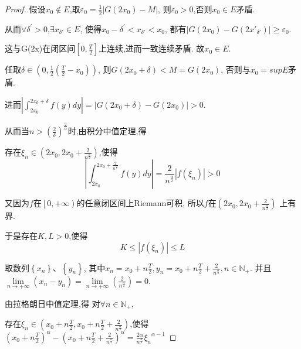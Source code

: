\documentclass[lang=cn,newtx,10pt,scheme=chinese]{elegantbook}
\begin{document}
\begin{proof}
假设$x_0\notin E$,取$\varepsilon _0=\frac{1}{2}\left| G\left( 2x_0 \right) -M \right|$,
则$\varepsilon _0>0$,否则$x_0\in E$矛盾.

从而$\forall \delta ^{\prime}>0$,$\exists x_{\delta'}\in E$,
使得$ x_0-\delta ^{\prime}<x_{\delta'}<x_0$,
都有$\left| G\left( 2x_0 \right) -G\left( 2x'_{\delta'} \right) \right|\geqslant \varepsilon _0$.

这与G(2x)在闭区间$\left[ 0,\frac{T}{2} \right]$上连续,进而一致连续矛盾.
故$x_0\in E$.

任取$\delta \in \left( 0,\frac{1}{2}\left( \frac{T}{2}-x_0 \right) \right) $,
则$G\left( 2x_0+\delta \right) <M=G\left( 2x_0 \right) $,
否则与$x_0=supE$矛盾.

进而$\left| \int_{2x_0}^{2x_0+\delta}{f\left( y \right) dy} \right|=\left| G\left( 2x_0+\delta \right) -G\left( 2x_0 \right) \right|>0$.

从而当$n>\left( \frac{2}{\delta} \right) ^{\frac{2}{\alpha}}$时,由积分中值定理,得

存在$\xi _n\in \left( 2x_0,2x_0+\frac{2}{n^{\frac{\alpha}{2}}} \right) $,使得
\begin{equation}\label{A}
    \left| \int_{2x_0}^{2x_0+\frac{2}{n^{\frac{\alpha}{2}}}}{f\left( y \right) dy} \right|=\frac{2}{n^{\frac{\alpha}{2}}}\left| f\left( \xi _n \right) \right|>0
\end{equation}

又因为$f$在$\left[ 0,+\infty \right)$的任意闭区间上Riemann可积,
所以$f$在$\left( 2x_0,2x_0+\frac{2}{n^{\frac{\alpha}{2}}} \right) $
上有界.

于是存在$K,L> 0$,使得
\begin{equation}\label{B}
  K\leqslant \left| f\left( \xi _n \right) \right|\leqslant L
\end{equation}

取数列$\left\{ x_n \right\} \text{、}\left\{ y_n \right\} $,
其中$x_n=x_0+n\frac{T}{2},y_n=x_0+n\frac{T}{2}+\frac{2}{n^{\frac{\alpha}{2}}},n\in \mathbb{N} _+$.
并且$\underset{n\rightarrow +\infty}{\lim}\left( x_n-y_n \right) =\underset{n\rightarrow +\infty}{\lim}\left( \frac{2}{n^{\frac{\alpha}{2}}} \right) =0$.

由拉格朗日中值定理,得
对$\forall n\in \mathbb{N} _+$,

存在$\xi _n\in \left( x_0+n\frac{T}{2},x_0+n\frac{T}{2}+\frac{2}{n^{\frac{\alpha}{2}}} \right) $,使得
$\left( x_0+n\frac{T}{2} \right) ^{\alpha}-\left( x_0+n\frac{T}{2}+\frac{2}{n^{\frac{\alpha}{2}}} \right) ^{\alpha}=\frac{2\alpha}{n^{\frac{\alpha}{2}}}{\xi _n}^{\alpha -1}$


\end{proof}
\end{document}
